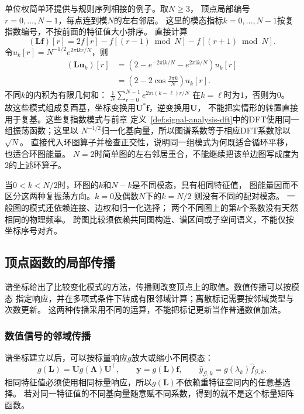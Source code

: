 单位权简单环提供与规则序列相接的例子。取\(N\geq3\)，
顶点局部编号\(r=0,\ldots,N-1\)，每点连到模\(N\)的左右邻居。
这里的模态指标\(k=0,\ldots,N-1\)按复指数编号，不按前面的特征值大小排序。
直接计算
\[
  (\bm L\bm f)[r]=2f[r]-f[(r-1)\bmod N]-f[(r+1)\bmod N].
\]
令\(u_k[r]=N^{-1/2}e^{2\pi\mathrm i kr/N}\)，则
\begin{align*}
  (\bm L\bm u_k)[r]
  &=\left(2-e^{-2\pi\mathrm i k/N}-e^{2\pi\mathrm i k/N}\right)u_k[r]\\
  &=\left(2-2\cos\frac{2\pi k}{N}\right)u_k[r].
\end{align*}
不同\(k\)的内积为有限几何和：
\(\frac1N\sum_{r=0}^{N-1}e^{2\pi\mathrm i(k-\ell)r/N}\)
在\(k=\ell\)时为\(1\)，否则为\(0\)。
故这些模式组成复酉基，坐标变换用\(\bm U^*\bm f\)，逆变换用\(\bm U\)，
不能把实情形的转置直接用于复基。这些复指数模式与前章
定义~\ref{def:signal-analysis-dft}中的DFT使用同一组振荡函数；这里以
\(N^{-1/2}\)归一化基向量，所以图谱系数等于相应DFT系数除以\(\sqrt N\)。
直接代入环图算子并检查正交性，说明同一组模式为何既适合循环平移，也适合环图能量。
\(N=2\)时简单图的左右邻居重合，不能继续把该单边图写成度为\(2\)的上述环算子。

当\(0<k<N/2\)时，环图的\(k\)和\(N-k\)是不同模态，具有相同特征值，
图能量因而不区分这两种复振荡方向。\(k=0\)及偶数\(N\)下的\(k=N/2\)
则没有不同的配对模态。
一般图的模式还依赖连接、边权和归一化选择；
两个不同图上的第\(k\)个系数没有天然相同的物理频率。
跨图比较须依赖共同图构造、谱区间或子空间语义，不能仅按坐标序号对齐。

\subsection{顶点函数的局部传播}

谱坐标给出了比较变化模式的方法，传播则改变顶点上的取值。数值传播可以按模态
指定响应，并在多项式条件下转成有限邻域计算；离散标记需要按邻域类型与次数更新。
这两种传播采用不同的运算，不能把标记更新当作普通数值加法。

\subsubsection{数值信号的邻域传播}

谱坐标建立以后，可以按标量响应\(g\)放大或缩小不同模态：
\[
  g(\bm L)=\bm U g(\bm\Lambda)\bm U^\top,\qquad
  \bm y=g(\bm L)\bm f,\qquad
  \widehat y_{\mathcal G,k}=g(\lambda_k)\widehat f_{\mathcal G,k}.
\]
相同特征值必须使用相同标量响应，所以\(g(\bm L)\)不依赖重特征空间内的任意基选择。
若对同一特征值的不同基向量随意赋不同系数，得到的就不是这个标量矩阵函数。

